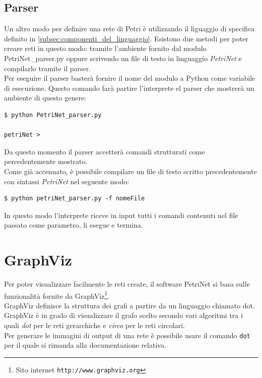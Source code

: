 \documentclass[italian,12pt]{book}
\begin{document}
\subsection{Parser}
Un altro modo per definire una rete di Petri è utilizzando il liguaggio
di specifica definito in \ref{subsec:componenti_del_linguaggio}. Esistono due 
metodi per poter creare reti in questo modo: tramite l'ambiente fornito dal
modulo PetriNet\_parser.py oppure scrivendo un file di testo in linguaggio 
\emph{PetriNet} e compilarlo tramite il parser.\\
Per eseguire il parser basterà fornire il nome del modulo a Python come 
variabile di esecuzione. Questo comando farà partire l'interprete el parser 
che mostrerà un ambiente di questo genere:
\begin{verbatim}
$ python PetriNet_parser.py 

petriNet > 
\end{verbatim} 
Da questo momento il parser accetterà comandi strutturati 
come percedentemente mostrato.\\
Come già accennato, è possibile compilare un file di testo
scritto precedentemente con sintassi \emph{PetriNet} nel seguente modo:
\begin{verbatim}
$ python petriNet_parser.py -f nomeFile
\end{verbatim}
In questo modo l'interprete riceve in input tutti i comandi 
contenuti nel file passato come parametro, li esegue e termina.
%
\section{GraphViz}
Per poter visualizzare facilmente le reti create, il software
PetriNet si basa sulle funzionalità fornite da 
GraphViz\footnote{Sito internet {\tt http://www.graphviz.org}}.\\
GraphViz definisce la struttura dei  grafi a partire da un
linguaggio chiamato dot. GraphViz è in grado di visualizzare il
grafo scelto secondo vari algoritmi tra i quali \emph{dot} per le
reti gerarchiche e \emph{circo} per le reti circolari.\\
Per generare le immagini di output di una rete è possibile usare
il comando \verb'dot' per il quale si rimanda alla documentazione
relativa.
%
%
%
\end{document}

